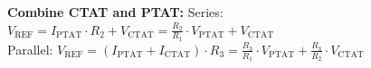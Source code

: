 \documentclass[5pt,landscape]{article}
\begin{document}
\begin{multicols*}{5}
\textbf{Combine CTAT and PTAT:}
Series: $ V_{\mathrm{REF}}=I_{\mathrm{PTAT}} \cdot R_{2}+V_{\mathrm{CTAT}}=\frac{R_{2}}{R_{1}} \cdot V_{\mathrm{PTAT}}+V_{\mathrm{CTAT}} $\\
Parallel: $ V_{\mathrm{REF}}=\left(I_{\mathrm{PTAT}}+I_{\mathrm{CTAT}}\right) \cdot R_{3}=\frac{R_{3}}{R_{1}} \cdot V_{\mathrm{PTAT}}+\frac{R_{3}}{R_{2}} \cdot V_{\mathrm{CTAT}} $\\





















\end{multicols*}
\end{document}
